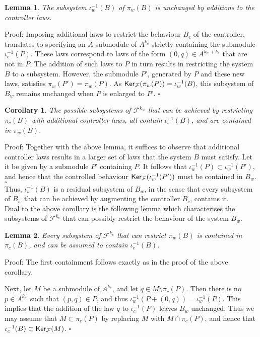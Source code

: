 \documentclass[11pt]{amsart}
\newtheorem{lemma}{Lemma}[section]
\newtheorem{corollary}{Corollary}[section]
\def\ker{\mathop{\sf Ker}}
\newcommand{\F}{\mathcal{F}}
\begin{document}
{\begin{lemma} The subsystem $\iota_w^{-1}(B)$ of $\pi_w(B)$ is unchanged by additions to the controller laws.
\end{lemma}
\noindent Proof: Imposing additional laws to restrict the behaviour $B_c$ of the controller, translates to specifying an $A$-submodule of $A^{k_c}$ strictly containing the submodule $\iota_c^{-1}(P)$. These laws correspond to laws of the form $(0, q) \in A^{k_w+k_c}$ that are not in $P$. The addition of such laws to $P$ in turn results in restricting the system $B$ to a subsystem. However, the submodule $P'$, generated by $P$ and these new laws, satisfies $\pi_w(P') = \pi_w(P)$. As $\ker_\F(\pi_w(P)) = \iota_w^{-1}(B)$, this subsystem of $B_w$ remains unchanged when $P$ is enlarged to $P'$.  \hspace*{\fill}$\square$

\begin{corollary} The possible subsystems of $\F^{k_w}$ that can be achieved by restricting $\pi_c(B)$ with additional controller laws, all contain $\iota_w^{-1}(B)$, and are contained in $\pi_w(B)$. 
\end{corollary}
\noindent Proof: Together with the above lemma, it suffices to observe that additional controller laws results in a larger set of laws that the system $B$ must satisfy. Let it be given by a submodule $P'$ containing $P$. It follows that $\iota_w^{-1}(P) \subset \iota^{-1}_w(P')$, and hence that the controlled behaviour $\ker_\F(\iota_w^{-1}(P'))$ must be contained in $B_w$. \hspace*{\fill}$\square$\\

Thus, $\iota_w^{-1}(B)$ is a residual subsystem of $B_w$, in the sense that every subsystem of $B_w$ that can be achieved by augmenting the controller $B_c$, contains it. \\

Dual to the above corollary is the following lemma which characterises  the subsystems of $\F^{k_c}$ that can possibly restrict the behaviour of the system $B_w$.

\begin{lemma} Every subsystem of $\F^{k_c}$ that can restrict $\pi_w(B)$ is contained in $\pi_c(B)$, and can be assumed to contain $\iota_c^{-1}(B)$.
\end{lemma}
\noindent Proof: The first containment follows exactly as in the proof of the above corollary.

Next, let $M$ be a submodule of $A^{k_c}$, and let $q \in M \setminus \pi_c(P)$. Then there is no $p \in A^{k_w}$ such that $(p,q) \in P$, and thus $\iota_w^{-1}(P + (0, q)) = \iota_w^{-1}(P)$.  This implies that the addition of the law $q$ to $\iota_c^{-1}(P)$ leaves $B_w$ unchanged. Thus we may assume that $M \subset \pi_c(P)$ by replacing $M$ with $M \cap \pi_c(P)$, and hence that $\iota_c^{-1}(B) \subset \ker_\F(M)$.
\hspace*{\fill}$\square$\\

}
\end{document}
